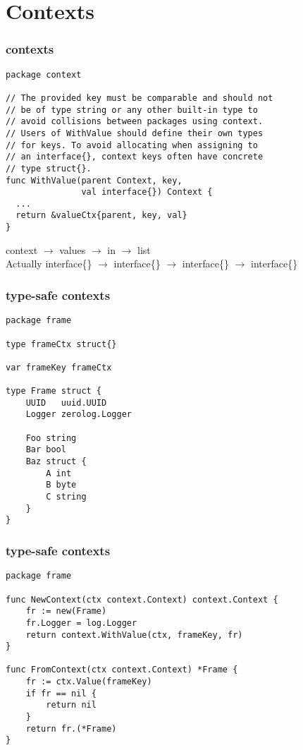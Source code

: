 \documentclass{beamer}
\begin{document}
\section{Contexts}

\begin{frame}[fragile]
\frametitle{contexts}
\begin{lstlisting}[basicstyle=\ttfamily\footnotesize]
package context

// The provided key must be comparable and should not
// be of type string or any other built-in type to
// avoid collisions between packages using context.
// Users of WithValue should define their own types
// for keys. To avoid allocating when assigning to
// an interface{}, context keys often have concrete
// type struct{}.
func WithValue(parent Context, key,
               val interface{}) Context {
  ...
  return &valueCtx{parent, key, val}
}
\end{lstlisting}
context $\rightarrow$ values $\rightarrow$ in $\rightarrow$ list \\
\pause
Actually interface\{\} $\rightarrow$ interface\{\} $\rightarrow$ interface\{\}
$\rightarrow$ interface\{\}
\end{frame}

\begin{frame}[fragile]
\frametitle{type-safe contexts}
\begin{lstlisting}[basicstyle=\ttfamily\footnotesize]
package frame

type frameCtx struct{}

var frameKey frameCtx

type Frame struct {
	UUID   uuid.UUID
	Logger zerolog.Logger

	Foo string
	Bar bool
	Baz struct {
		A int
		B byte
		C string
	}
}
\end{lstlisting}
\end{frame}


\begin{frame}[fragile]
\frametitle{type-safe contexts}
\begin{lstlisting}[basicstyle=\ttfamily\footnotesize]
package frame

func NewContext(ctx context.Context) context.Context {
	fr := new(Frame)
	fr.Logger = log.Logger
	return context.WithValue(ctx, frameKey, fr)
}

func FromContext(ctx context.Context) *Frame {
	fr := ctx.Value(frameKey)
	if fr == nil {
		return nil
	}
	return fr.(*Frame)
}
\end{lstlisting}
\end{frame}
\end{document}
